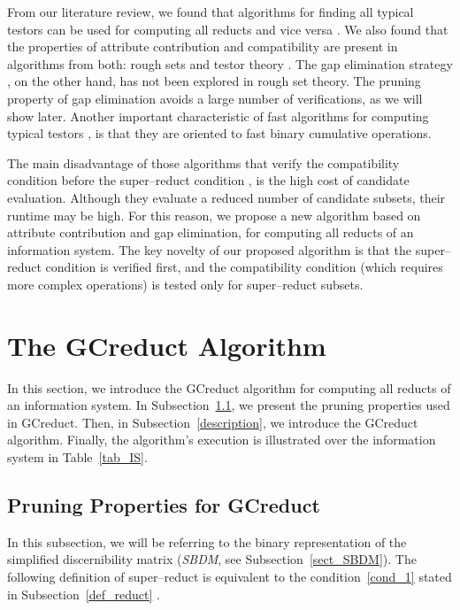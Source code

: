 \documentclass[number,preprint,review,12pt]{elsarticle}
\begin{document}
  From our literature review, we found that algorithms for finding all typical testors can be used for computing all reducts and vice versa \citep{Lazo15}. We also found that the properties of attribute contribution and compatibility are present in algorithms from both: rough sets \citep{WangP07} and testor theory \citep{Sanchez10,Lias13}. The gap elimination strategy \citep{Santiesteban03,Lias13}, on the other hand, has not been explored in rough set theory. The pruning property of gap elimination avoids a large number of verifications, as we will show later. Another important characteristic of fast algorithms for computing typical testors \citep{Sanchez10,Lias13}, is that they are oriented to fast binary cumulative operations. 
  
  The main disadvantage of those algorithms that verify the compatibility condition before the super--reduct condition \citep{Santiesteban03,WangP07,Lias13}, is the high cost of candidate evaluation. Although they evaluate a reduced number of candidate subsets, their runtime may be high. For this reason, we propose a new algorithm based on attribute contribution and gap elimination, for computing all reducts of an information system. The key novelty of our proposed algorithm is that the super--reduct condition is verified first, and the compatibility condition (which requires more complex operations) is tested only for super--reduct subsets.
  
  
\section{The GCreduct Algorithm}\label{GCreduct}
  In this section, we introduce the GCreduct algorithm for computing all reducts of an information system. In  Subsection~\ref{properties}, we present the pruning properties used in GCreduct. Then, in Subsection~\ref{description}, we introduce the GCreduct algorithm. Finally, the algorithm's execution is illustrated over the information system in Table~\ref{tab_IS}.
  
\subsection{Pruning Properties for GCreduct}\label{properties}
	In this subsection, we will be referring to the binary representation of the simplified discernibility matrix
	(\textit{SBDM}, see Subsection~\ref{sect_SBDM}). The following definition of super--reduct is equivalent to the condition~\ref{cond_1} stated in 
	Subsection~\ref{def_reduct} \citep{Lazo15}.
	
\end{document}
